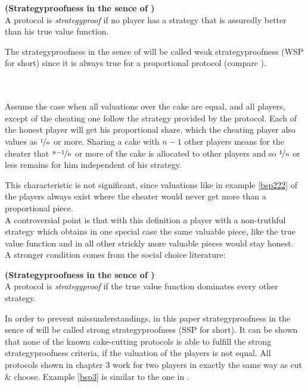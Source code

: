 \begin{defi}{\textbf{(Strategyproofness in the sence of \cite{pie})}}\\
A protocol is \emph{strategyproof} if no player has a strategy that is assuredly better than his true value function.
\end{defi}
The strategyproofness in the sence of \cite{pie} will be called weak strategyproofness (WSP for short) since it is always true for a proportional protocol (compare \cite{ccc}).
\newpage
\begin{bsp}
\label{bsp222}
\textcolor{white}{x}\\\\
Assume the case when all valuations over the cake are equal, and all players, except of the cheating one follow the strategy provided by the protocol. Each of the honest player will get his proportional share, which the cheating player also values as $\nicefrac{1}{n}$ or more. Sharing a cake with $n-1$ other players means for the cheater that $\nicefrac{n-1}{n}$ or more of the cake is allocated to other players and so $\nicefrac{1}{n}$ or less remains for him independent of his strategy. 
\end{bsp}
This characteristic is not significant, since valuations like in example \ref{bsp222} of the players always exist where the cheater would never get more than a proportional piece.\\
A controversial point is that with this definition a player with a non-truthful strategy which obtains in one special case the same valuable piece, like the true value function and in all other strickly more valuable pieces would stay honest.\\
\newline
A stronger condition comes from the social choice literature:

\begin{defi}{\textbf{(Strategyproofness in the sence of \cite{why})}}\\
A protocol is \emph{strategyproof} if the true value function dominates every other strategy.
\end{defi}

In order to prevent missunderstandings, in this paper strategyproofness in the sence of \cite{why} will be called strong strategyproofness (SSP for short). It can be shown that none of the known cake-cutting protocols is able to fulfill the strong strategyproofness criteria, if the valuation of the players is not equal. All protocols shown in chapter 3 work  for two players in exactly the same way as cut $\&$ choose. Example \ref{bsp3} is similar to the one in \cite{chen:truth}.

